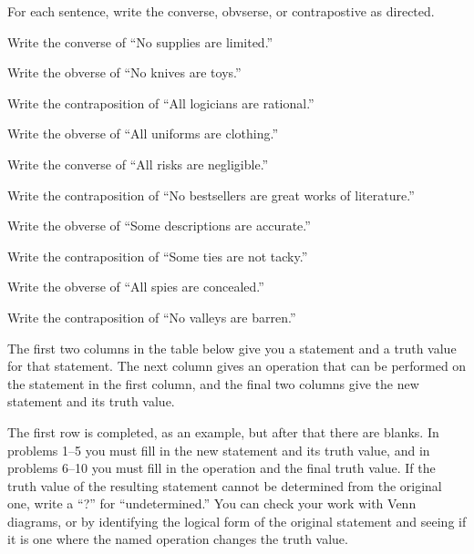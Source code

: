 \noindent \problempart For each sentence, write the converse, obvserse, or contrapostive as directed.
\begin{exercises}
\item Write the converse of ``No supplies are limited.''
\item Write the obverse of ``No knives are toys.''
\item Write the contraposition of ``All logicians are rational.''
\item Write the obverse of ``All uniforms are clothing.''
\item Write the converse of ``All risks are negligible.''
\item Write the contraposition of ``No bestsellers are great works of literature.''
\item Write the obverse of ``Some descriptions are accurate.''
\item Write the contraposition of ``Some ties are not tacky.''
\item Write the obverse of ``All spies are concealed.''
\item Write the contraposition of ``No valleys are barren.''
\end{exercises}


\problempart The first two columns in the table below give you a statement and a truth value for that statement. The next column gives an operation that can be performed on the statement in the first column, and the final two columns give the new statement and its truth value.

The first row is completed, as an example, but after that there are blanks. In problems 1--5 you must fill in the new statement and its truth value, and in problems 6--10 you must fill in the operation and the final truth value. If the truth value of the resulting statement cannot be determined from the original one, write a ``?'' for ``undetermined.'' You can check your work with Venn diagrams, or by identifying the logical form of the original statement and seeing if it is one where the named operation changes the truth value.

